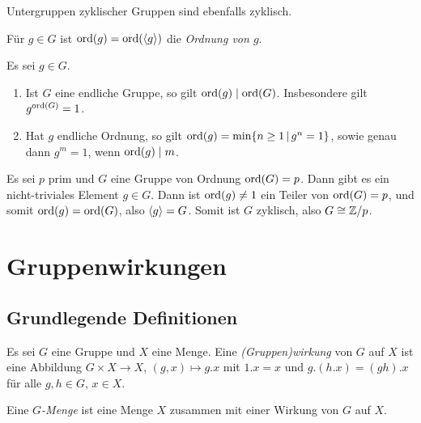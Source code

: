 \begin{corollary}
  Untergruppen zyklischer Gruppen sind ebenfalls zyklisch.
\end{corollary}

\begin{definition}
  Für $g \in G$ ist $\operatorname{ord}(g) = \operatorname{ord}(\langle g\rangle)$ die \emph{Ordnung von $g$}.
\end{definition}

\begin{lemma}
  Es sei $g \in G$.
  \begin{enumerate}
    \item
      Ist $G$ eine endliche Gruppe, so gilt $\operatorname{ord}(g) \mathrel{|} \operatorname{ord}(G)$.
      Insbesondere gilt $g^{\operatorname{ord}(G)} = 1$.
    \item
      Hat $g$ endliche Ordnung, so gilt $\ord{g} = \min \{ n \geq 1 \suchthat g^n = 1 \}$, sowie genau dann $g^m = 1$, wenn $\operatorname{ord}(g) \mathrel{|} m$.
  \end{enumerate}
\end{lemma}

\begin{example}
  Es sei $p$ prim und $G$ eine Gruppe von Ordnung $\operatorname{ord}(G) = p$.
  Dann gibt es ein nicht-triviales Element $g \in G$.
  Dann ist $\operatorname{ord}(g) \neq 1$ ein Teiler von $\operatorname{ord}(G) = p$, und somit $\operatorname{ord}(g) = \operatorname{ord}(G)$, also $\langle g\rangle = G$.
  Somit ist $G$ zyklisch, also $G \cong \mathbb{Z}/p$.
\end{example}






\section{Gruppenwirkungen}



\subsection{Grundlegende Definitionen}

\begin{definition}
  Es sei $G$ eine Gruppe und $X$ eine Menge.
  Eine \emph{\textup(Gruppen\textup)wirkung} von $G$ auf $X$ ist eine Abbildung $G \times X \to X$, $(g,x) \mapsto g.x$ mit $1.x = x$ und $g.(h.x) = (gh).x$ für alle $g, h \in G$, $x \in X$.
  
  Eine \emph{$G$-Menge} ist eine Menge $X$ zusammen mit einer Wirkung von $G$ auf $X$.
\end{definition}

